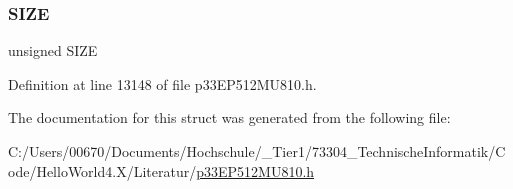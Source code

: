 \subsubsection{\texorpdfstring{S\+I\+ZE}{SIZE}}
{\footnotesize\ttfamily unsigned S\+I\+ZE}



Definition at line 13148 of file p33\+E\+P512\+M\+U810.\+h.



The documentation for this struct was generated from the following file\+:\begin{DoxyCompactItemize}
\item 
C\+:/\+Users/00670/\+Documents/\+Hochschule/\+\_\+\+Tier1/73304\+\_\+\+Technische\+Informatik/\+Code/\+Hello\+World4.\+X/\+Literatur/\hyperlink{p33_e_p512_m_u810_8h}{p33\+E\+P512\+M\+U810.\+h}\end{DoxyCompactItemize}
